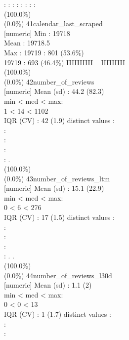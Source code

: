 \documentclass[
  journal,
]{IEEEtran}%
\begin{document}
: : : : : : : : \\
(100.0\%) \\
(0.0\%) \textbar{} \textbar{} 41\textbar calendar\_last\_scraped\\
{[}numeric{]} \textbar Min : 19718\\
Mean : 19718.5\\
Max : 19719  : 801 (53.6\%)\\
19719 : 693 (46.4\%) \textbar{} \textbar IIIIIIIIII ~ IIIIIIIII
\\
(100.0\%) \\
(0.0\%) \textbar{} \textbar{} 42\textbar number\_of\_reviews\\
{[}numeric{]} \textbar Mean (sd) : 44.2 (82.3)\\
min \textless{} med \textless{} max:\\
1 \textless{} 14 \textless{} 1102\\
IQR (CV) : 42 (1.9)  distinct values \textbar{} \textbar:\\
:\\
:\\
:\\
: . \\
(100.0\%) \\
(0.0\%) \textbar{} \textbar{} 43\textbar number\_of\_reviews\_ltm\\
{[}numeric{]} \textbar Mean (sd) : 15.1 (22.9)\\
min \textless{} med \textless{} max:\\
0 \textless{} 6 \textless{} 276\\
IQR (CV) : 17 (1.5)  distinct values \textbar{} \textbar:\\
:\\
:\\
:\\
: . . \\
(100.0\%) \\
(0.0\%) \textbar{} \textbar{} 44\textbar number\_of\_reviews\_l30d\\
{[}numeric{]} \textbar Mean (sd) : 1.1 (2)\\
min \textless{} med \textless{} max:\\
0 \textless{} 0 \textless{} 13\\
IQR (CV) : 1 (1.7)  distinct values \textbar{} \textbar:\\
:\\
:\\
\end{document}
